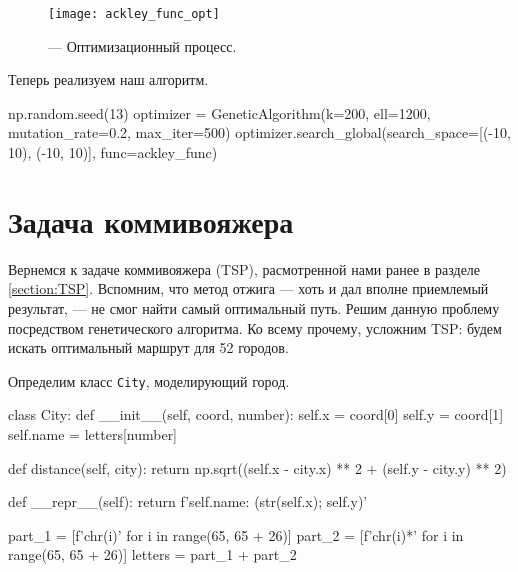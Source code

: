 \begin{figure}[h!!]
\centering
\texttt{[image: ackley\_func\_opt]}
\caption{ --- Оптимизационный процесс.}
\label{img:ackley_func_opt}
\end{figure}

\newpage
Теперь реализуем наш алгоритм.
\begin{pyin}
np.random.seed(13)
optimizer = GeneticAlgorithm(k=200, ell=1200, mutation_rate=0.2,
                             max_iter=500)
optimizer.search_global(search_space=[(-10, 10), (-10, 10)],
                        func=ackley_func)
\end{pyin}





\section{Задача коммивояжера}
\noindent
Вернемся к задаче коммивояжера (TSP), расмотренной нами ранее в разделе \ref{section:TSP}. Вспомним, что метод отжига --- хоть и дал вполне приемлемый результат, --- не смог найти самый оптимальный путь. Решим данную проблему посредством генетического алгоритма. Ко всему прочему, усложним TSP: будем искать оптимальный маршрут для 52 городов.

Определим класс \texttt{City}, моделирующий город.


\begin{pyin}
class City:
  def __init__(self, coord, number):
    self.x = coord[0]
    self.y = coord[1]
    self.name = letters[number]

  def distance(self, city):
    return np.sqrt((self.x - city.x) ** 2 + (self.y - city.y) ** 2)
\end{pyin}

\begin{pyprint}
  def __repr__(self):
    return f'{self.name}: ({str(self.x)}; {self.y})'

part_1 = [f'{chr(i)}' for i in range(65, 65 + 26)]
part_2 = [f'{chr(i)}*' for i in range(65, 65 + 26)]
letters = part_1 + part_2
\end{pyprint}

